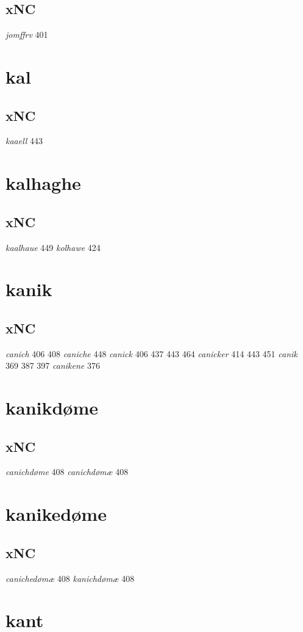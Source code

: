 \documentclass[a4paper,twocolumn]{article}
\begin{document}
\subsection{xNC}
\label{sec:org74636db}
\emph{jomffrv} 401 
\section{kal}
\label{sec:org924eac2}
\subsection{xNC}
\label{sec:orgf26d111}
\emph{kaaell} 443 
\section{kalhaghe}
\label{sec:orge333a29}
\subsection{xNC}
\label{sec:orgd879258}
\emph{kaalhaue} 449 \emph{kolhawe} 424 
\section{kanik}
\label{sec:org628dd76}
\subsection{xNC}
\label{sec:orgf58b07c}
\emph{canich} 406 408 \emph{caniche} 448 \emph{canick} 406 437 443 464 \emph{canicker} 414 443 451 \emph{canik} 369 387 397 \emph{canikene} 376 
\section{kanikdøme}
\label{sec:orgef683a9}
\subsection{xNC}
\label{sec:org69c593e}
\emph{canichdøme} 408 \emph{canichdømæ} 408 
\section{kanikedøme}
\label{sec:orgc31786f}
\subsection{xNC}
\label{sec:org9008eeb}
\emph{canichedømæ} 408 \emph{kanichdømæ} 408 
\section{kant}
\label{sec:orgbe3564e}
\end{document}
